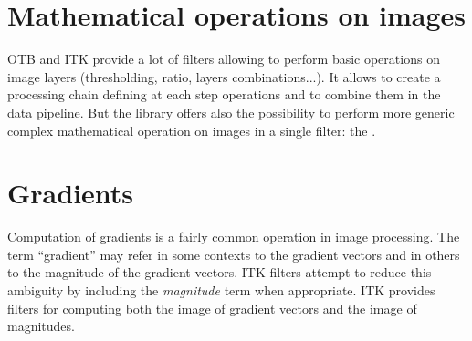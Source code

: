 





\section{Mathematical operations on images}
OTB and ITK provide a lot of filters allowing to perform basic operations on image layers (thresholding, ratio, layers combinations...).
It allows to create a processing chain defining at each step operations and to combine them in the data pipeline.
But the library offers also the possibility to perform more generic complex mathematical operation on images in a single filter: the
.

\ifitkFullVersion

\fi

\section{Gradients}
\label{sec:GradientFiltering}

Computation of gradients is a fairly common operation in image processing. The
term ``gradient'' may refer in some contexts to the gradient vectors and in
others to the magnitude of the gradient vectors. ITK filters attempt to
reduce this ambiguity by including the \emph{magnitude} term when
appropriate. ITK provides filters for computing both the image of gradient
vectors and the image of magnitudes.

